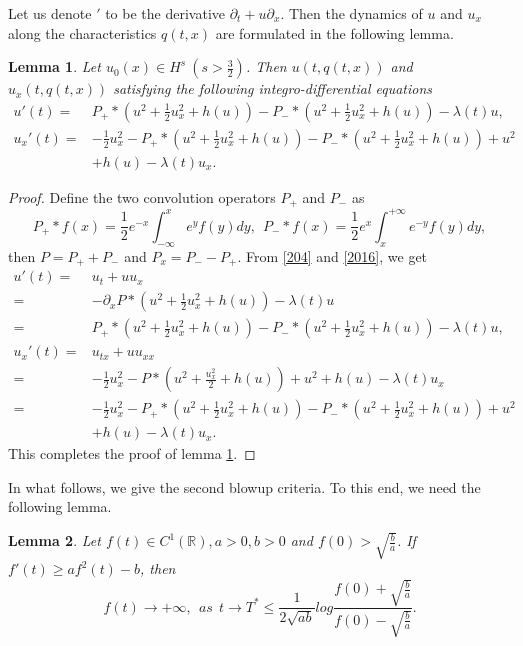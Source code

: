 \documentclass[preprint,12pt]{elsarticle}
\numberwithin{equation}{section}
\newtheorem{lemma}{Lemma}[section]
\begin{document}
Let us denote $'$ to be the derivative $\partial_{t}+u\partial_{x}$. Then the dynamics of $u$ and $u_{x}$ along the characteristics $q(t,x)$ are formulated in the following lemma.
\begin{lemma}
\label{lem303}  Let $u_{0}(x)\in H^{s}\ (s>\frac{3}{2})$. Then $u(t,q(t,x))$ and $u_{x}(t,q(t,x))$ satisfying the following integro-differential equations
\begin{align*}
u'(t)=&P_{+}\ast\left(u^{2}+\frac{1}{2}u_{x}^{2}+h(u)\right)-P_{-}\ast\left(u^{2}+\frac{1}{2}u_{x}^{2}+h(u)\right)-\lambda(t) u,\\
u_{x}'(t)=&-\frac{1}{2}u_{x}^{2}-P_{+}\ast\left(u^{2}+\frac{1}{2}u_{x}^{2}+h(u)\right)-P_{-}\ast\left(u^{2}+\frac{1}{2}u_{x}^{2}
+h(u)\right)+u^{2}\\
&+h(u)-\lambda(t) u_{x}.
\end{align*}
\end{lemma}
\begin{proof}
Define the two convolution operators $P_{+}$ and $P_{-}$ as
$$P_{+}\ast f(x)=\frac{1}{2}e^{-x}\int_{-\infty}^{x}e^{y}f(y)dy,\ \
P_{-}\ast f(x)=\frac{1}{2}e^{x}\int^{+\infty}_{x}e^{-y}f(y)dy,$$
then $P=P_{+}+P_{-}$ and $P_{x}=P_{-}-P_{+}$.
From \eqref{204} and \eqref{2016}, we get
\begin{align*}
u'(t)=&u_{t}+uu_{x}\nonumber\\
=&-\partial_{x}P\ast\left(u^{2}+\frac{1}{2}u_{x}^{2}+h(u)\right)-\lambda(t) u\nonumber\\
=&P_{+}\ast\left(u^{2}+\frac{1}{2}u_{x}^{2}+h(u)\right)-P_{-}\ast\left(u^{2}+\frac{1}{2}u_{x}^{2}+h(u)\right)-\lambda(t) u,\nonumber\\
u_{x}'(t)=&u_{tx}+uu_{xx}\nonumber\\
=&-\frac{1}{2}u_{x}^{2}-P\ast\left(u^{2}+\frac{u_{x}^{2}}{2}+h(u)\right)+u^{2}
+h(u)-\lambda(t) u_{x}\nonumber\\
=&-\frac{1}{2}u_{x}^{2}-P_{+}\ast\left(u^{2}+\frac{1}{2}u_{x}^{2}+h(u)\right)-P_{-}\ast\left(u^{2}+\frac{1}{2}u_{x}^{2}
+h(u)\right)+u^{2}\\
&+h(u)-\lambda(t) u_{x}.
\end{align*}
This completes the proof of lemma \ref{lem303}.
\end{proof}

In what follows, we give the second blowup criteria. To this end, we need the following lemma.
\begin{lemma} \cite{Chen2016}
\label{lem207}Let $f(t)\in C^{1}(\mathbb{R}), a>0, b>0$ and $f(0)>\sqrt{\frac{b}{a}}$. If $f'(t)\geq af^{2}(t)-b$, then
$$f(t)\rightarrow +\infty,\ \ as\ \ t\rightarrow T^{*}\leq \frac{1}{2\sqrt{ab}}log\frac{f(0)+\sqrt{\frac{b}{a}}}{f(0)-\sqrt{\frac{b}{a}}}.$$
\end{lemma}
\end{document}
